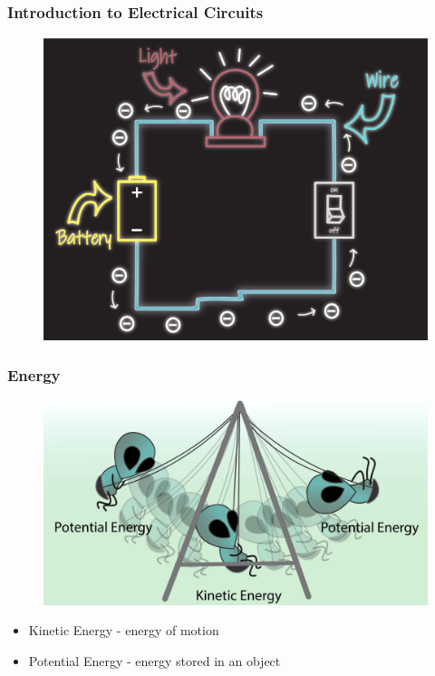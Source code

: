 \documentclass{beamer}
\begin{document}
\begin{frame}
\frametitle{Introduction to Electrical Circuits}
\begin{figure}
\includegraphics[scale=0.15]{fig/circuits2.png} 
\end{figure}
\end{frame}

\begin{frame}
\frametitle{Energy}
\begin{figure}
\includegraphics[scale=0.15]{fig/EnergyAlien.jpg} 
\end{figure}
\begin{itemize} 
\item Kinetic Energy - energy of motion
\item Potential Energy - energy stored in an object
\end{itemize}
\end{frame}
\end{document}
